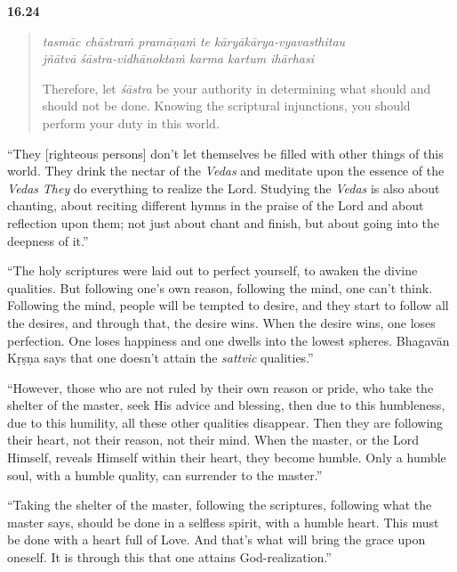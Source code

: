 \par\noindent\textbf{16.24}\par
\begin{verse}
\textit{tasmāc chāstraṁ pramāṇaṁ te kāryākārya-vyavasthitau} \\
\textit{jñātvā śāstra-vidhānoktaṁ karma kartum ihārhasi}

\noindent Therefore, let \textit{śāstra} be your authority in determining what should and should not be done. Knowing the scriptural injunctions, you should perform your duty in this world.
\end{verse}
\par


\enquote{They [righteous persons] don’t let themselves be filled with other things of this world. They drink the nectar of the \textit{Vedas} and meditate upon the essence of the \textit{Vedas} \textit{They} do everything to realize the Lord. Studying the \textit{Vedas} is also about chanting, about reciting different hymns in the praise of the Lord and about reflection upon them; not just about chant and finish, but about going into the deepness of it.}

\enquote{The holy scriptures were laid out to perfect yourself, to awaken the divine qualities. But following one’s own reason, following the mind, one can’t think. Following the mind, people will be tempted to desire, and they start to follow all the desires, and through that, the desire wins. When the desire wins, one loses perfection. One loses happiness and one dwells into the lowest spheres. Bhagavān Kṛṣṇa says that one doesn’t attain the \textit{sattvic} qualities.}

\enquote{However, those who are not ruled by their own reason or pride, who take the shelter of the master, seek His advice and blessing, then due to this humbleness, due to this humility, all these other qualities disappear. Then they are following their heart, not their reason, not their mind. When the master, or the Lord Himself, reveals Himself within their heart, they become humble. Only a humble soul, with a humble quality, can surrender to the master.}

\enquote{Taking the shelter of the master, following the scriptures, following what the master says, should be done in a selfless spirit, with a humble heart. This must be done with a heart full of Love. And that’s what will bring the grace upon oneself. It is through this that one attains God-realization.}
